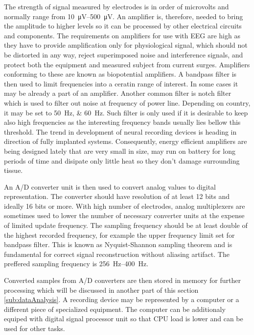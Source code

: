 The strength of signal measured by electrodes is in order of microvolts and
normally range from \SIrange{10}{500}{\uV}. \cite{neuralAmp} An amplifier is,
therefore, needed to bring the amplitude to higher levels so it can be processed
by other electrical circuits and components. The requirements on amplifiers for
use with EEG are high as they have to provide amplification only for physiological
signal, which should not be distorted in any way, reject superimposed noise and
interference signals, and protect both the equipment and measured subject from
current surges. Amplifiers conforming to these are known as biopotential
amplifiers. \cite{biopotAmp}
A bandpass filter is then used to limit frequencies into a ceratin range of
interest. In some cases it may be already a part of an amplifier.
Another common filter is notch filter which is used to filter out noise
at frequency of power line. Depending on country, it may be set to
\SIlist[list-units = single, list-pair-separator = { or }]{50;60}{\Hz}.
\cite{deltaCompNREM} Such filter is only used if it is desirable to keep also
high frequencies as the interesting frequency bands usually lies bellow this
threshold.
The trend in development of neural recording devices is heading in direction of
fully implanted systems. Consequently, energy efficient amplifiers are being
designed lately that are very small in size, may run on battery for long
periods of time and disipate only little heat so they don't damage surrounding
tissue. \cite{neuralAmp}

An A/D converter unit is then used to convert analog values to digital
representation. The converter should have resolution of at least 12 bits and
ideally 16 bits or more. With high number of electrodes, analog multiplexers are
sometimes used to lower the number of necessary converter units at the expense
of limited update frequency. The sampling frequency should be at least double of
the highest recorded frequency, for example the upper frequency limit set for
bandpass filter. This is known as Nyquist-Shannon sampling theorem and is
fundamental for correct signal reconstruction without aliasing artifact. The
preffered sampling frequency is \SIrange{256}{400}{\Hz}. \cite{guidDigEEG}

Converted samples from A/D converters are then stored in memory for further
processing which will be discussed in another part of this section
\ref{sub:dataAnalysis}. A recording device may be represented by a computer or a
different piece of specialized equipment. The computer can be additionaly
equiped with digital signal processor unit so that CPU load is lower and can be
used for other tasks.

